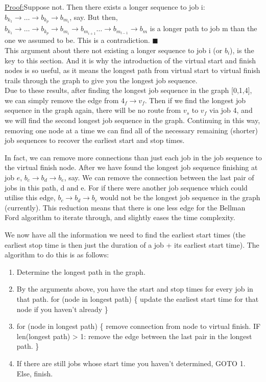 \documentclass[paper=a4, fontsize=12pt]{scrartcl} %
\newenvironment{claimproof}[1]{\par\noindent\underline{Proof:}\space#1}{\hfill $\blacksquare$}
\numberwithin{equation}{section}       %
\numberwithin{figure}{section}         %
\numberwithin{table}{section}          %
\begin{document}
\begin{claimproof}
Suppose not. Then there exists a longer sequence to job i: $b_{k_{1}} \to \dots \to b_{k_{p}} \to b_{m_{i}}$, say. But then, $b_{k_{1}} \to \dots \to b_{k_{p}} \to b_{m_{i}} \to b_{m_{i+1}} \dots \to b_{m_{l-1}} \to b_{m}$ is a longer path to job m than the one we assumed to be. This is a contradiction.
\end{claimproof}
\\
This argument about there not existing a longer sequence to job i (or $b_{i}$), is the key to this section. And it is why the introduction of the virtual start and finish nodes is so useful, as it means the longest path from virtual start to virtual finish trails through the graph to give you the longest job sequence. \\ 

Due to these results, after finding the longest job sequence in the graph [0,1,4], we can simply remove the edge from $4_{f} \to v_{f}$. Then if we find the longest job sequence in the graph again, there will be no route from $v_{s}$ to $v_{f}$ via job 4, and we will find the second longest job sequence in the graph. Continuing in this way, removing one node at a time we can find all of the necessary remaining (shorter) job sequences to recover the earliest start and stop times.

In fact, we can remove more connections than just each job in the job sequence to the virtual finish node. After we have found the longest job sequence finishing at job $e$, $b_{c} \to b_{d} \to b_{e}$, say. We can remove the connection between the last pair of jobs in this path, d and e. For if there were another job sequence which could utilise this edge, $b_{c} \to b_{d} \to b_{e}$ would not be the longest job sequence in the graph (currently). This reduction means that there is one less edge for the Bellman Ford algorithm to iterate through, and slightly eases the time complexity.

We now have all the information we need to find the earliest start times (the earliest stop time is then just the duration of a job + its earliest start time). The algorithm to do this is as follows:

\begin{enumerate}
\item Determine the longest path in the graph.
\item  By the arguments above, you have the start and stop times for every job in that path. for (node in longest path) \{ update the earliest start time for that node if you haven't already \}
\item for (node in longest path) \{ remove connection from node to virtual finish.
IF len(longest path) > 1: remove the edge between the last pair in the longest path.
\}
\item If there are still jobs whose start time you haven't determined, GOTO 1. Else, finish.
\end{enumerate}
\end{document}

